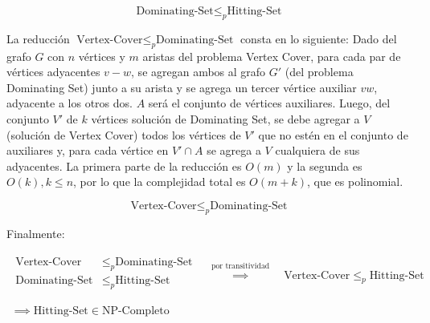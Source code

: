 \[\text{Dominating-Set}  \leq _{p} \text{Hitting-Set}\]


La reducción $\text{Vertex-Cover} \leq _{p} \text{Dominating-Set}$ consta en lo siguiente:
Dado del grafo $G$ con $n$ vértices y $m$ aristas del problema Vertex Cover, para cada par de vértices adyacentes $v-w$, se agregan ambos al grafo $G'$ (del problema Dominating Set) junto a su arista y se agrega un tercer vértice auxiliar $vw$, adyacente a los otros dos. $A$ será el conjunto de vértices auxiliares. Luego, del conjunto $V'$ de $k$ vértices solución de Dominating Set, se debe agregar a $V$ (solución de Vertex Cover) todos los vértices de $V'$ que no estén en el conjunto de auxiliares y, para cada vértice en $V' \cap A$ se agrega a $V$ cualquiera de sus adyacentes. La primera parte de la reducción es $O(m)$ y la segunda es $O(k),k \leq n$, por lo que la complejidad total es $O(m+k)$, que es polinomial.

\[\text{Vertex-Cover} \leq _{p} \text{Dominating-Set}\]


Finalmente:

\[
    \begin{array}{c}
        \begin{split}
            \text{Vertex-Cover}  & \leq _{p} \text{Dominating-Set} \\
            \text{Dominating-Set}  & \leq _{p} \text{Hitting-Set} \\
        \end{split}
        \quad \overset{ \text{por transitividad} }{ \implies  } \quad
        \text{Vertex-Cover}  \leq _{p} \text{Hitting-Set} \\ \\
        \implies \text{Hitting-Set} \in \text{NP-Completo}    
    \end{array}
\]